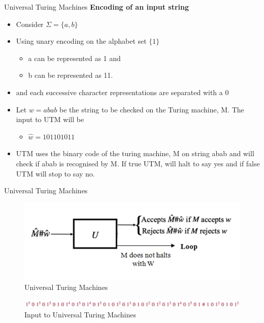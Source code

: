 \documentclass{beamer}
\begin{document}
\begin{frame}{Universal Turing Machines}
	\textbf{Encoding of an input string}
	\begin{itemize}
		\item Consider $\Sigma = \{a,b\}$
		\item Using unary encoding on the alphabet set $\{1\}$
		\begin{itemize}
			\item a can be represented as 1 and
			\item b can be represented  as 11.
		\end{itemize}
	\item and each successive character representations are separated with a 0
		\item 	Let $w = abab$  be the string to be checked on the Turing machine, M. The input to UTM will be
		\begin{itemize}
			\item $\hat{w} = 101101011$
		\end{itemize}
	\item UTM uses the binary code of the turing machine, M on string abab and will check if abab is recognised by M. If true
	UTM, will halt to say yes and if false UTM will stop to say no.

	\end{itemize}

\end{frame}
\begin{frame}{Universal Turing Machines}
	\begin{figure}
		\includegraphics[scale=.55]{img5/m23}
		\caption{Universal Turing Machines}
	\end{figure}
	\begin{figure}
	\includegraphics[scale=.55]{img5/m24}
	\caption{Input to Universal Turing Machines}
\end{figure}
\end{frame}
\end{document}
